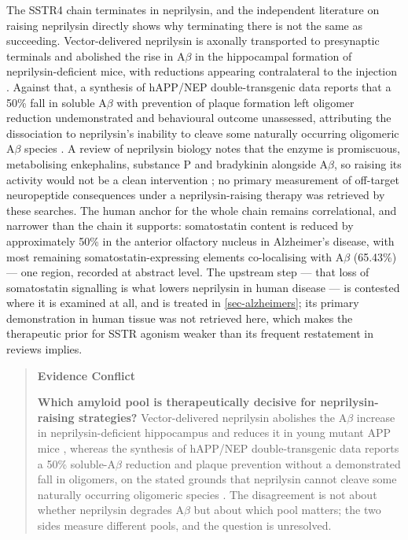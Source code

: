 \documentclass[11pt]{article}
\begin{document}
The SSTR4 chain terminates in neprilysin, and the independent literature on raising neprilysin directly shows why terminating there is not the same as succeeding. Vector-delivered neprilysin is axonally transported to presynaptic terminals and abolished the rise in A$\beta$ in the hippocampal formation of neprilysin-deficient mice, with reductions appearing contralateral to the injection \citep{Iwata2004}. Against that, a synthesis of hAPP/NEP double-transgenic data reports that a 50\% fall in soluble A$\beta$ with prevention of plaque formation left oligomer reduction undemonstrated and behavioural outcome unassessed, attributing the dissociation to neprilysin's inability to cleave some naturally occurring oligomeric A$\beta$ species \citep{Grimm2013}. A review of neprilysin biology notes that the enzyme is promiscuous, metabolising enkephalins, substance P and bradykinin alongside A$\beta$, so raising its activity would not be a clean intervention \citep{Saxena2024}; no primary measurement of off-target neuropeptide consequences under a neprilysin-raising therapy was retrieved by these searches. The human anchor for the whole chain remains correlational, and narrower than the chain it supports: somatostatin content is reduced by approximately 50\% in the anterior olfactory nucleus in Alzheimer's disease, with most remaining somatostatin-expressing elements co-localising with A$\beta$ (65.43\%) \citep{SaizSanchez2010} --- one region, recorded at abstract level. The upstream step --- that loss of somatostatin signalling is what lowers neprilysin in human disease --- is contested where it is examined at all, and is treated in \ref{sec-alzheimers}; its primary demonstration in human tissue was not retrieved here, which makes the therapeutic prior for SSTR agonism weaker than its frequent restatement in reviews implies.

\begin{quote}
\noindent\textbf{Evidence Conflict}\par
\textbf{Which amyloid pool is therapeutically decisive for neprilysin-raising strategies?} Vector-delivered neprilysin abolishes the A$\beta$ increase in neprilysin-deficient hippocampus and reduces it in young mutant APP mice \citep{Iwata2004}, whereas the synthesis of hAPP/NEP double-transgenic data reports a 50\% soluble-A$\beta$ reduction and plaque prevention without a demonstrated fall in oligomers, on the stated grounds that neprilysin cannot cleave some naturally occurring oligomeric species \citep{Grimm2013}. The disagreement is not about whether neprilysin degrades A$\beta$ but about which pool matters; the two sides measure different pools, and the question is unresolved.

\end{quote}
\end{document}
